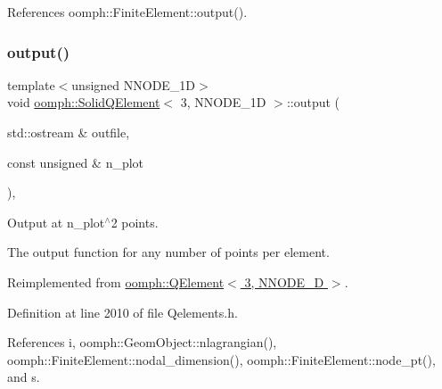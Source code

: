 References oomph\+::\+Finite\+Element\+::output().

\mbox{\label{classoomph_1_1SolidQElement_3_013_00_01NNODE__1D_01_4_ac3ad47275d4cf27cd0ec0b7ec1c1f369}} 
\subsubsection{\texorpdfstring{output()}{output()}\hspace{0.1cm}{\footnotesize\ttfamily [2/4]}}
{\footnotesize\ttfamily template$<$unsigned N\+N\+O\+D\+E\+\_\+1D$>$ \\
void \hyperlink{classoomph_1_1SolidQElement}{oomph\+::\+Solid\+Q\+Element}$<$ 3, N\+N\+O\+D\+E\+\_\+1D $>$\+::output (\begin{DoxyParamCaption}\item[{std\+::ostream \&}]{outfile,  }\item[{const unsigned \&}]{n\+\_\+plot }\end{DoxyParamCaption})\hspace{0.3cm}{\ttfamily [inline]}, {\ttfamily [virtual]}}



Output at n\+\_\+plot$^\wedge$2 points. 

The output function for any number of points per element. 

Reimplemented from \hyperlink{classoomph_1_1QElement_3_013_00_01NNODE__1D_01_4_a7023719931a1aa50096f1eeee34d173e}{oomph\+::\+Q\+Element$<$ 3, N\+N\+O\+D\+E\+\_\+D $>$}.



Definition at line 2010 of file Qelements.\+h.



References i, oomph\+::\+Geom\+Object\+::nlagrangian(), oomph\+::\+Finite\+Element\+::nodal\+\_\+dimension(), oomph\+::\+Finite\+Element\+::node\+\_\+pt(), and s.

\mbox{\label{classoomph_1_1SolidQElement_3_013_00_01NNODE__1D_01_4_aa31ca4d1e3f97ba0a062141707d7aaf3}} 
